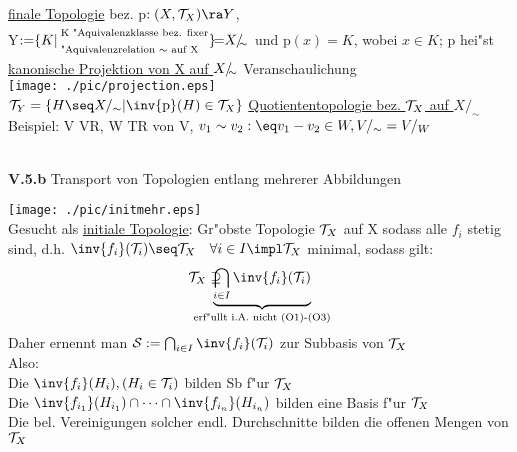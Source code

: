 \begin{minipage}[l]{7.4cm}
\ul{finale Topologie} bez. p$:(X,\T_X)\ra Y$,\\
Y$:=\hspace*{-0.1cm}\{K|\hspace*{-0.2cm}\left.\begin{array}{l}\mbox{\scriptsize K "Aquivalenzklasse bez. fixer}\\\mbox{\scriptsize "Aquivalenzrelation $\sim$ auf X}\end{array}\right.\hspace*{-0.2cm}\}\hspace*{-0.15cm}=\hspace*{-0.1cm}X/\hspace*{-0.1cm}_\sim$ und p$(x)=K$, wobei $x\in K$; p hei"st \ul{kanonische Projektion von X auf $X/\hspace*{-0.1cm}_\sim$}
Veranschaulichung\\
\texttt{[image: ./pic/projection.eps]}\\
$\T_Y=\{ H\seq X/_\sim |\inv{\mbox{p}}(H)\in\T_X\}$ \ul{Quotiententopologie bez. $\mathcal T_X$ auf $X/_\sim$}\\
Beispiel: V VR, W TR von V, $v_1\sim v_2 :\eq v_1-v_2\in W, V/_\sim = V/_W$\vspace*{1.7cm}
\end{minipage}\vspace*{0.1cm}\\
\newpage
{\bf V.5.b }\label{5.5.b}{\sc Transport von Topologien entlang mehrerer Abbildungen}\vspace*{0.4cm}\\
\begin{minipage}{7cm}
\texttt{[image: ./pic/initmehr.eps]}\\
Gesucht als \ul{initiale Topologie}: Gr"obste Topologie $\mathcal T_X$ auf X sodass alle $f_i$ stetig sind, d.h. $\inv{f_i}(\T_i)\seq\T_X\quad \forall i\in I\\
\impl\T_X$ minimal, sodass gilt:
$$\T_X\supseteq\hspace*{-0.8cm} \underbrace{\bigcap_{i\in I}\inv{f_i}(\T_i)}_{\mbox{\scriptsize erf"ullt i.A. nicht (O1)-(O3)}}$$
Daher ernennt man $\Sb :=\bigcap_{i\in I}\inv{f_i}(\T_i)$ zur Subbasis von $\mathcal T_X$\\
Also:\\{\small
Die $\inv{f_i}(H_i), (H_i\in\T_i)$ bilden Sb f"ur $\mathcal T_X$\\
Die $\inv{f_{i_1}}(H_{i_1})\cap\dots\cap\inv{f_{i_n}}(H_{i_n})$ bilden eine Basis f"ur $\mathcal T_X$\\
Die bel. Vereinigungen solcher endl. Durchschnitte bilden die offenen Mengen von $\mathcal T_X$}
\end{minipage}\hspace*{0.5cm}

